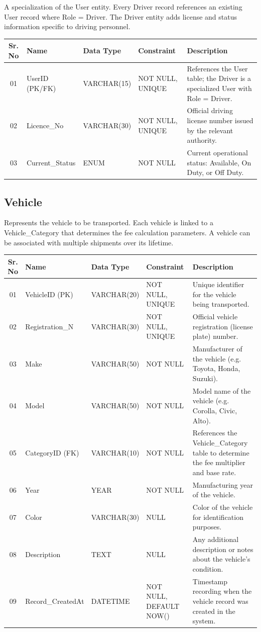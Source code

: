 \documentclass[12pt,a4paper]{report}
\begin{document}
A specialization of the User entity. Every Driver record references an existing User record where Role = Driver. The Driver entity adds license and status information specific to driving personnel.

\begin{longtable}{|c|p{3.5cm}|p{2.5cm}|p{3.5cm}|p{5cm}|}
\hline
\textbf{Sr. No} & \textbf{Name} & \textbf{Data Type} & \textbf{Constraint} & \textbf{Description} \\
\hline
01 & UserID (PK/FK) & VARCHAR(15) & NOT NULL, UNIQUE & References the User table; the Driver is a specialized User with Role = Driver. \\
\hline
02 & Licence\_No & VARCHAR(30) & NOT NULL, UNIQUE & Official driving license number issued by the relevant authority. \\
\hline
03 & Current\_Status & ENUM & NOT NULL & Current operational status: Available, On Duty, or Off Duty. \\
\hline
\end{longtable}


\subsection{Vehicle}

Represents the vehicle to be transported. Each vehicle is linked to a Vehicle\_Category that determines the fee calculation parameters. A vehicle can be associated with multiple shipments over its lifetime.

\begin{longtable}{|c|p{3.5cm}|p{2.5cm}|p{3.5cm}|p{5cm}|}
\hline
\textbf{Sr. No} & \textbf{Name} & \textbf{Data Type} & \textbf{Constraint} & \textbf{Description} \\
\hline
01 & VehicleID (PK) & VARCHAR(20) & NOT NULL, UNIQUE & Unique identifier for the vehicle being transported. \\
\hline
02 & Registration\_N & VARCHAR(30) & NOT NULL, UNIQUE & Official vehicle registration (license plate) number. \\
\hline
03 & Make & VARCHAR(50) & NOT NULL & Manufacturer of the vehicle (e.g. Toyota, Honda, Suzuki). \\
\hline
04 & Model & VARCHAR(50) & NOT NULL & Model name of the vehicle (e.g. Corolla, Civic, Alto). \\
\hline
05 & CategoryID (FK) & VARCHAR(10) & NOT NULL & References the Vehicle\_Category table to determine the fee multiplier and base rate. \\
\hline
06 & Year & YEAR & NOT NULL & Manufacturing year of the vehicle. \\
\hline
07 & Color & VARCHAR(30) & NULL & Color of the vehicle for identification purposes. \\
\hline
08 & Description & TEXT & NULL & Any additional description or notes about the vehicle's condition. \\
\hline
09 & Record\_CreatedAt & DATETIME & NOT NULL, DEFAULT NOW() & Timestamp recording when the vehicle record was created in the system. \\
\hline
\end{longtable}
\end{document}
